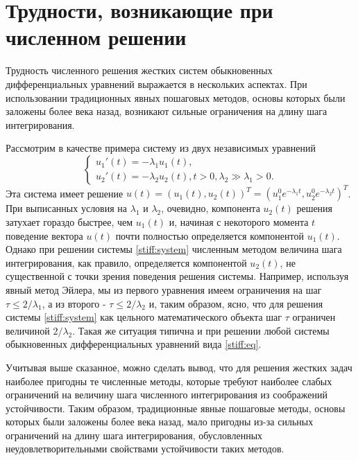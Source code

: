 \documentclass[a4paper,14pt]{extreport}
\begin{document}
  
  \section{Трудности, возникающие при численном решении}
  \label{s:stiff_troubles} Трудность численного решения жестких систем обыкновенных дифференциальных уравнений выражается в нескольких аспектах. При использовании традиционных явных пошаговых методов, основы которых были заложены более века назад, возникают сильные ограничения на длину шага интегрирования.
  
  
  Рассмотрим в качестве примера систему из двух независимых уравнений   
  \begin{equation}
  \label{stiff:system}
  \begin{cases}
   u_1'(t)=-\lambda_1 u_1(t), 
   \\
    u_2'(t)=-\lambda_2 u_2(t), t>0, \lambda_2 \gg \lambda_1 > 0.
  \end{cases}
  \end{equation}
  Эта система имеет решение $u(t)=(u_1(t), u_2(t))^T = (u_1^0 e^{-\lambda_1 t}, u_2^0 e^{-\lambda_2 t})^T$. При выписанных условия на $\lambda_1$ и $\lambda_2$, очевидно, компонента $u_2(t)$ решения затухает гораздо быстрее, чем $u_1(t)$ и, начиная с некоторого момента $t$ поведение вектора $u(t)$ почти полностью определяется компонентой $u_1(t)$. Однако при решении системы \eqref{stiff:system} численным методом величина шага интегрирования, как правило, определяется компонентой $u_2(t)$, не существенной с точки зрения поведения решения системы. Например, используя явный метод Эйлера, мы из первого уравнения имеем ограничения на шаг $\tau \le 2/\lambda_1$, а из второго - $\tau \le 2/\lambda_2$ и, таким образом, ясно, что для решения системы \eqref{stiff:system} как цельного математического объекта шаг $\tau$ ограничен величиной $2/\lambda_2$. Такая же ситуация типична и при решении любой системы обыкновенных дифференциальных уравнений вида \eqref{stiff:eq}.
  
Учитывая выше сказанное, можно сделать вывод, что для решения жестких задач наиболее пригодны те численные методы, которые требуют наиболее слабых ограничений на величину шага численного интегрирования из соображений устойчивости. Таким образом, традиционные явные пошаговые методы, основы которых были заложены более века назад, мало пригодны из-за сильных ограничений на длину шага интегрирования, обусловленных неудовлетворительными свойствами устойчивости таких методов. 
\end{document}
